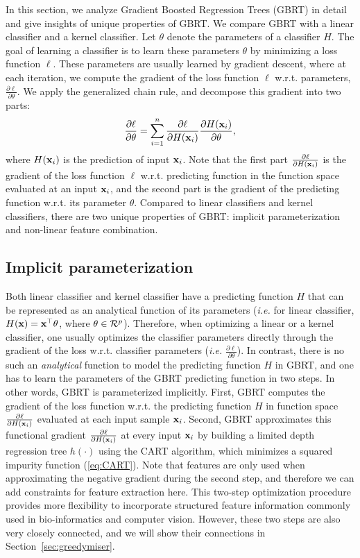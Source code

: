 In this section, we analyze Gradient Boosted Regression Trees (GBRT) in detail and give insights of unique properties of GBRT. We compare GBRT with a linear classifier and a kernel classifier. Let $\theta$ denote the parameters of a classifier $H$. The goal of learning a classifier is to learn these parameters $\theta$ by minimizing a loss function $\ell$. These parameters are usually learned by gradient descent, where at each iteration, we compute the gradient of the loss function $\ell$ w.r.t. parameters, $\frac{\partial \ell}{\partial \theta}$. We apply the generalized chain rule, and decompose this gradient into two parts:
\begin{align}
	\frac{\partial \ell}{\partial \theta} = \sum_{i=1}^n \frac{\partial \ell}{\partial H(\mathbf{x}_i)} \frac{\partial H(\mathbf{x}_i)}{\partial \theta}, \label{eq:chainrule}
\end{align}  
where $H(\mathbf{x}_i)$ is the prediction of input $\mathbf{x}_i$. Note that the first part $\frac{\partial \ell}{\partial H(\mathbf{x}_i)}$ is the gradient of the loss function $\ell$ w.r.t. predicting function in the function space evaluated at an input $\mathbf{x}_i$, and the second part is the gradient of the predicting function w.r.t. its parameter $\theta$. Compared to linear classifiers and kernel classifiers, there are two unique properties of GBRT: implicit parameterization and non-linear feature combination.

\subsection{Implicit parameterization} Both linear classifier and kernel classifier have a predicting function $H$ that can be represented as an analytical function of its parameters (\emph{i.e.} for linear classifier, $H(\mathbf{x}) = \mathbf{x}^\top\theta$, where $\theta \in {\cal R}^p$). Therefore, when optimizing a linear or a kernel classifier, one usually optimizes the classifier parameters directly through the gradient of the loss w.r.t. classifier parameters (\emph{i.e. }$\frac{\partial \ell}{\partial \theta}$). In contrast, there is no such an \emph{analytical} function to model the predicting function $H$ in GBRT, and one has to learn the parameters of the GBRT predicting function in two steps. In other words, GBRT is parameterized implicitly. First, GBRT computes the gradient of the loss function w.r.t. the predicting function $H$ in function space $\frac{\partial \ell}{\partial H(\mathbf{x}_i)}$ evaluated at each input sample $\mathbf{x}_i$. Second, GBRT approximates this functional gradient $\frac{\partial \ell}{\partial H(\mathbf{x}_i)}$ at every input $\mathbf{x}_i$ by building a limited depth regression tree $h(\cdot)$ using the CART algorithm, which minimizes a squared impurity function (\ref{eq:CART}). Note that features are only used when approximating the negative gradient during the second step, and therefore we can add constraints for feature extraction here. This two-step optimization procedure provides more flexibility to incorporate structured feature information commonly used in bio-informatics and computer vision. However, these two steps are also very closely connected, and we will show their connections in Section~\ref{sec:greedymiser}. 

